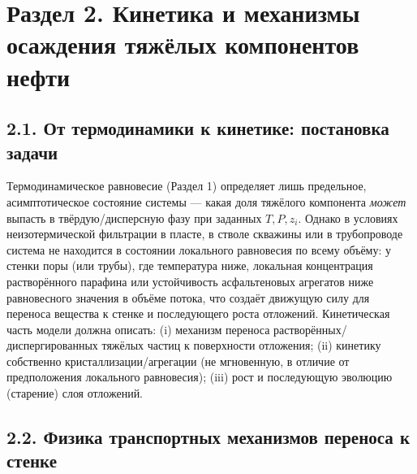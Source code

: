 \documentclass[11pt]{extarticle}
\begin{document}
\newpage

\section{Раздел 2. Кинетика и механизмы осаждения тяжёлых компонентов нефти}\label{ux440ux430ux437ux434ux435ux43b-2.-ux43aux438ux43dux435ux442ux438ux43aux430-ux438-ux43cux435ux445ux430ux43dux438ux437ux43cux44b-ux43eux441ux430ux436ux434ux435ux43dux438ux44f-ux442ux44fux436ux451ux43bux44bux445-ux43aux43eux43cux43fux43eux43dux435ux43dux442ux43eux432-ux43dux435ux444ux442ux438}

\subsection{2.1. От термодинамики к кинетике: постановка задачи}\label{ux43eux442-ux442ux435ux440ux43cux43eux434ux438ux43dux430ux43cux438ux43aux438-ux43a-ux43aux438ux43dux435ux442ux438ux43aux435-ux43fux43eux441ux442ux430ux43dux43eux432ux43aux430-ux437ux430ux434ux430ux447ux438}

Термодинамическое равновесие (Раздел 1) определяет лишь предельное, асимптотическое состояние системы --- какая доля тяжёлого компонента \emph{может} выпасть в твёрдую/дисперсную фазу при заданных \(T, P, z_i\). Однако в условиях неизотермической фильтрации в пласте, в стволе скважины или в трубопроводе система не находится в состоянии локального равновесия по всему объёму: у стенки поры (или трубы), где температура ниже, локальная концентрация растворённого парафина или устойчивость асфальтеновых агрегатов ниже равновесного значения в объёме потока, что создаёт движущую силу для переноса вещества к стенке и последующего роста отложений. Кинетическая часть модели должна описать: (i) механизм переноса растворённых/диспергированных тяжёлых частиц к поверхности отложения; (ii) кинетику собственно кристаллизации/агрегации (не мгновенную, в отличие от предположения локального равновесия); (iii) рост и последующую эволюцию (старение) слоя отложений.

\subsection{2.2. Физика транспортных механизмов переноса к стенке}\label{ux444ux438ux437ux438ux43aux430-ux442ux440ux430ux43dux441ux43fux43eux440ux442ux43dux44bux445-ux43cux435ux445ux430ux43dux438ux437ux43cux43eux432-ux43fux435ux440ux435ux43dux43eux441ux430-ux43a-ux441ux442ux435ux43dux43aux435}
\end{document}
